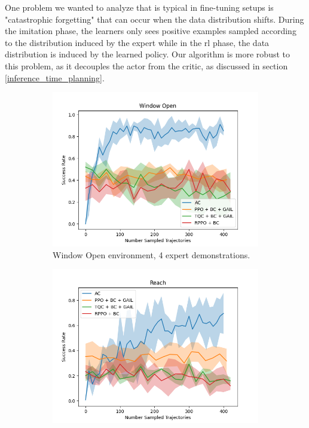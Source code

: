 One problem we wanted to analyze that is typical in fine-tuning setups 
is "catastrophic forgetting" 
that can occur when the data distribution shifts. During the imitation phase, the learners only sees positive examples sampled according to 
the distribution induced by the expert while in the \ac{rl} phase, the data distribution is induced by the learned policy.
Our algorithm is more robust to this problem, as it 
decouples the actor from the critic, as discussed in section \ref{inference_time_planning}.\\ 

\begin{figure}[htbp]
  \centering
  \begin{subfigure}[t]{0.45\textwidth}
    \includegraphics[width=\textwidth]{images/FineTuning/Window Open.png}
    \caption{Window Open environment, 4 expert demonstrations.}
    \label{fig:plot3}
  \end{subfigure}
  \begin{subfigure}[t]{0.45\textwidth}
    \includegraphics[width=\textwidth]{images/FineTuning/Reach.png}

\end{subfigure}
\end{figure}
